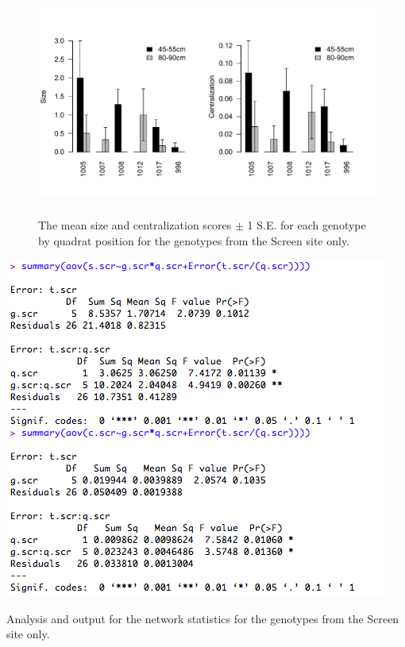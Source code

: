 \documentclass[11pt]{article}
\begin{document}
\begin{figure}[h]
\includegraphics[width=16.5cm,height=7.5cm]{screenFig.pdf}
\caption{The mean size and centralization scores  $\pm$ 1 S.E. for each genotype by quadrat position for the genotypes from the Screen site only.}
\end{figure}

\begin{table}[h]
\includegraphics[scale=1]{screen}
\caption{Analysis and output for the network statistics for the genotypes from the Screen site only.}
\end{table}

\newpage
\end{document}
